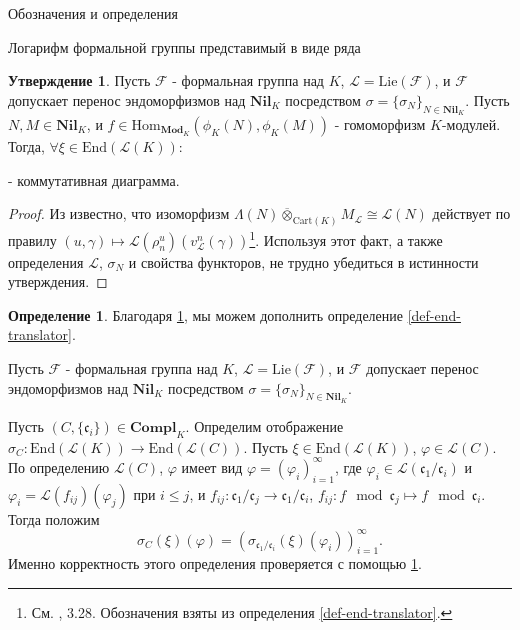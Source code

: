 \documentclass[a4paper,14pt]{extarticle}
\theoremstyle{definition}
\newtheorem{definition}{Определение}[section]
\newtheorem{claim}[theorem]{Утверждение}
\newcommand{\Cart}{\mathrm{Cart}}
\newcommand{\End}[1]{\mathrm{End}\left(#1\right)}
\newcommand{\Compl}[1]{\mathbf{Compl}_{#1}}
\newcommand{\forget}[1]{\phi_{#1}}
\newcommand{\Lie}[1]{\mathrm{Lie}\left(#1\right)}
\newcommand{\Mod}[1]{\mathbf{Mod}_{#1}}
\newcommand{\Nil}[1]{\mathbf{Nil}_{#1}}
\newcommand{\fc}{\mathfrak{c}}
\newcommand{\sF}{\mathscr{F}}
\newcommand{\sL}{\mathscr{L}}
\begin{document}
\begin{section}{Обозначения и определения}
\begin{subsection}{Логарифм формальной группы представимый в виде ряда}
\begin{claim}\label{claim-sigmaN_property}
    Пусть $\sF$ - формальная группа над $K$, ${ \sL = \Lie{\sF} }$, и $\sF$ допускает перенос эндоморфизмов над $\Nil{K}$ посредством ${ \sigma = \{ \sigma_N \}_{N \in \Nil{K}} }$. Пусть ${ N, M \in \Nil{K} }$, и ${ f \in \mathrm{Hom}_{\Mod{K}}(\forget{K}(N), \forget{K}(M)) }$ - гомоморфизм $K$-модулей. Тогда, ${ \forall \xi \in \End{\sL(K)} }$:
    \begin{center}
    \end{center}
    - коммутативная диаграмма.
\end{claim}
\begin{proof}
    Из \cite{Zink} известно, что изоморфизм ${ \Lambda(N) \overline{\otimes}_{\Cart(K)} M_\sL \cong \sL(N) }$ действует по правилу ${ (u, \gamma) \mapsto \sL(\rho^u_n)(v_\sL^n(\gamma)) }$\footnote{
        См. \cite{Zink}, 3.28. Обозначения взяты из определения \ref{def-end-translator}.
    }. Используя этот факт, а также определения $\sL$, $\sigma_N$ и свойства функторов, не трудно убедиться в истинности утверждения.
\end{proof}

\begin{definition}
    Благодаря \ref{claim-sigmaN_property}, мы можем дополнить определение \ref{def-end-translator}.

    Пусть $\sF$ - формальная группа над $K$, ${ \sL = \Lie{\sF} }$, и $\sF$ допускает перенос эндоморфизмов над $\Nil{K}$ посредством ${ \sigma = \{ \sigma_N \}_{N \in \Nil{K}} }$.

    Пусть ${ (C, \{ \fc_i \}) \in \Compl{K} }$. Определим отображение ${ \sigma_C : \End{\sL(K)} \rightarrow \End{\sL(C)} }$. Пусть ${ \xi \in \End{\sL(K)} }$, ${ \varphi \in \sL(C) }$. По определению $\sL(C)$, $\varphi$ имеет вид ${ \varphi = (\varphi_i)_{i = 1}^\infty }$, где ${ \varphi_i \in \sL(\fc_1 / \fc_i) }$ и ${ \varphi_i = \sL(f_{i j})(\varphi_j) }$ при ${ i \leq j }$, и ${ f_{i j} : \fc_1 / \fc_j \rightarrow \fc_1 / \fc_i }$, ${ f_{i j} : f \mod \fc_j \mapsto f \mod \fc_i }$. Тогда положим
    \begin{equation*}
        \sigma_C(\xi)(\varphi) =
        \left(
            \sigma_{\fc_1 / \fc_i}(\xi)(\varphi_i)
        \right)_{i = 1}^\infty.
    \end{equation*}
    Именно корректность этого определения проверяется с помощью \ref{claim-sigmaN_property}.


\end{definition}
\end{subsection}
\end{section}
\end{document}
